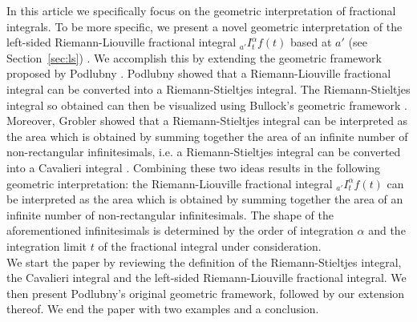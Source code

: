 \documentclass[twoside,reqno,11pt]{fcaa-var} %
\begin{document}
\noindent
In this article we specifically focus on the geometric interpretation of fractional integrals. To be more specific, we present a novel geometric interpretation of the left-sided Riemann-Liouville fractional integral $_{a'}I_t^{\alpha} f(t)$ based at $a'$ (see Section~\ref{sec:ls}) \cite{laurent1884}. We accomplish this by extending the geometric framework proposed by Podlubny \cite{podlubny02}.
Podlubny showed that a Riemann-Liouville fractional integral can be converted into a Riemann-Stieltjes integral. The Riemann-Stieltjes integral so obtained can then be visualized using Bullock's geometric framework \cite{bullock88}. Moreover, Grobler showed that a Riemann-Stieltjes integral can be interpreted as the area which is obtained by summing together the area of an infinite number of non-rectangular infinitesimals, i.e. a Riemann-Stieltjes integral can be converted into a Cavalieri integral \cite{ackermann12,grobler19}. Combining these two ideas results in the following geometric interpretation: the Riemann-Liouville fractional integral $_{a'}I_t^{\alpha} f(t)$ can be interpreted as the area which is obtained by summing together the area of an infinite number of non-rectangular infinitesimals. The shape
of the aforementioned infinitesimals is determined by the order of integration $\alpha$ and the integration limit $t$ of the fractional integral under consideration.\\

\noindent
We start the paper by reviewing the definition of the Riemann-Stieltjes integral, the Cavalieri integral and the left-sided Riemann-Liouville fractional integral. We then present Podlubny's original geometric framework, followed by our extension thereof. We end the paper with two examples and a conclusion.
\end{document}
